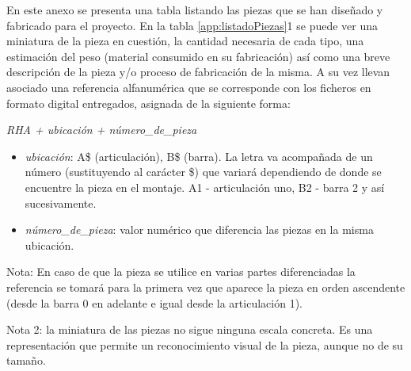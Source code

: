 
En este anexo se presenta una tabla listando las piezas que se han diseñado y fabricado para el proyecto. En la tabla \ref{app:listadoPiezas}1 se puede ver una miniatura de la pieza en cuestión, la cantidad necesaria de cada tipo, una estimación del peso (material consumido en su fabricación) así como una breve descripción de la pieza y/o proceso de fabricación de la misma. A su vez llevan asociado una referencia alfanumérica que se corresponde con los ficheros en formato digital entregados, asignada de la siguiente forma:

\begin{center} 
	\textit{RHA + ubicación + número\_de\_pieza}
\end{center}

\begin{itemize}
	\item \textit{ubicación}: A\$ (articulación), B\$ (barra). La letra va acompañada de un número (sustituyendo al carácter \$) que variará dependiendo de donde se encuentre la pieza en el montaje. A1 - articulación uno, B2 - barra 2 y así sucesivamente.
	\item \textit{número\_de\_pieza}: valor numérico que diferencia las piezas en la misma ubicación.
\end{itemize}

Nota: En caso de que la pieza se utilice en varias partes diferenciadas la referencia se tomará para la primera vez que aparece la pieza en orden ascendente (desde la barra 0 en adelante e igual desde la articulación 1).

Nota 2: la miniatura de las piezas no sigue ninguna escala concreta. Es una representación que permite un reconocimiento visual de la pieza, aunque no de su tamaño.


